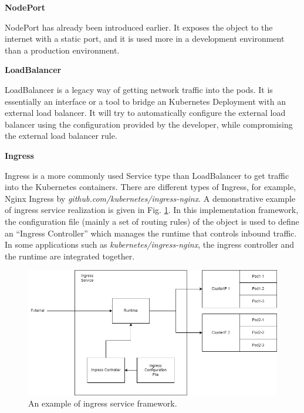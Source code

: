\vspace{0.1in}
\noindent \textbf{NodePort}
\vspace{0.1in}

NodePort has already been introduced earlier. It exposes the object to the internet with a static port, and it is used more in a development environment than a production environment.

\vspace{0.1in}
\noindent \textbf{LoadBalancer}
\vspace{0.1in}

LoadBalancer is a legacy way of getting network traffic into the pods. It is essentially an interface or a tool to bridge an Kubernetes Deployment with an external load balancer. It will try to automatically configure the external load balancer using the configuration provided by the developer, while compromising the external load balancer rule.

\vspace{0.1in}
\noindent \textbf{Ingress}
\vspace{0.1in}

Ingress is a more commonly used Service type than LoadBalancer to get traffic into the Kubernetes containers. There are different types of Ingress, for example, Nginx Ingress by \textit{github.com/kubernetes/ingress-nginx}. A demonstrative example of ingress service realization is given in Fig. \ref{ch:vac:fig:ingress_service}. In this implementation framework, the configuration file (mainly a set of routing rules) of the object is used to define an ``Ingress Controller'' which manages the runtime that controls inbound traffic. In some applications such as \textit{kubernetes/ingress-nginx}, the ingress controller and the runtime are integrated together.

\begin{figure}[htbp]
	\centering
	\includegraphics[width=350pt]{chapters/part-3/figures/ingress_service.png}
	\caption{An example of ingress service framework.} \label{ch:vac:fig:ingress_service}
\end{figure}

